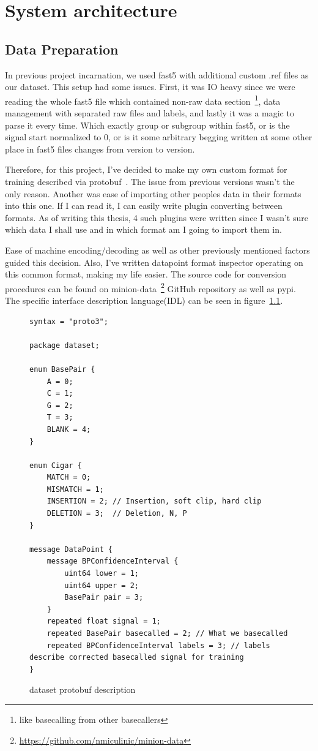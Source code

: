 \documentclass[times, utf8, diplomski, english]{fer}
\begin{document}
\chapter{System architecture}
\label{chap:system_arhitecture}
\section{Data Preparation}
\label{sec:data_preparation}
In previous project incarnation, we used fast5 with additional custom .ref files as our dataset. This setup had some issues. First, it was IO heavy since we were reading the whole fast5 file which contained non-raw data section~\footnote{like basecalling from other basecallers}, data management with separated raw files and labels, and lastly it was a magic to parse it every time. Which exactly group or subgroup within fast5, or is the signal start normalized to 0, or is it some arbitrary begging written at some other place in fast5 files changes from version to version. 

Therefore, for this project, I've decided to make my own custom format for training described via protobuf~\citep{protobuf}. The issue from previous versions wasn't the only reason. Another was ease of importing other peoples data in their formats into this one. If I can read it, I can easily write plugin converting between formats. As of writing this thesis, 4 such plugins were written since I wasn't sure which data I shall use and in which format am I going to import them in. 

Ease of machine encoding/decoding as well as other previously mentioned factors guided this decision. Also, I've written datapoint format inspector operating on this common format, making my life easier. The source code for conversion procedures can be found on minion-data~\footnote{\url{https://github.com/nmiculinic/minion-data}} GitHub repository as well as pypi. The specific interface description language(IDL) can be seen in figure~\ref{fg:dataset_proto}.


\begin{figure}
    \begin{center}
    \begin{lstlisting}[language=protobuf3,style=protobuf]
syntax = "proto3";

package dataset;

enum BasePair {
    A = 0;
    C = 1;
    G = 2;
    T = 3;
    BLANK = 4;
}

enum Cigar {
    MATCH = 0;
    MISMATCH = 1;
    INSERTION = 2; // Insertion, soft clip, hard clip
    DELETION = 3;  // Deletion, N, P
}

message DataPoint {
    message BPConfidenceInterval {
        uint64 lower = 1;
        uint64 upper = 2;
        BasePair pair = 3;
    }
    repeated float signal = 1;
    repeated BasePair basecalled = 2; // What we basecalled
    repeated BPConfidenceInterval labels = 3; // labels describe corrected basecalled signal for training
}
    \end{lstlisting}
    \caption{dataset protobuf description}
    \label{fg:dataset_proto}
    \end{center}
\end{figure}
\end{document}
